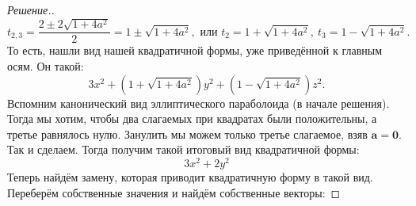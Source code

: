 \documentclass[a4paper]{article}
\theoremstyle{remark}
\begin{document}
\begin{proof}[Решение.]
        \begin{equation*}
          t_{2,3} = \frac{2 \pm 2\sqrt{1 + 4a^2}}{2} = 1 \pm \sqrt{1 + 4a^2},\text{ или }t_2 = 1 + \sqrt{1 + 4a^2},\ t_3 = 1 - \sqrt{1 + 4a^2}.
        \end{equation*}
        То есть, нашли вид нашей квадратичной формы, уже приведённой к главным осям. Он такой:
        \begin{equation*}
          3x^2 + \left(1 + \sqrt{1 + 4a^2} \right)y^2 + \left(1 - \sqrt{1 + 4a^2} \right)z^2.
        \end{equation*}
        Вспомним канонический вид эллиптического параболоида (в начале решения). Тогда мы хотим, чтобы два слагаемых при квадратах были положительны, а третье равнялось нулю. Занулить мы можем только третье слагаемое, взяв $\bm{a = 0}$. Так и сделаем. Тогда получим такой итоговый вид квадратичной формы:
        \begin{equation*}
          3x^2 + 2y^2
        \end{equation*}
        Теперь найдём замену, которая приводит квадратичную форму в такой вид. Переберём собственные значения и найдём собственные векторы:
\end{proof}
\end{document}

